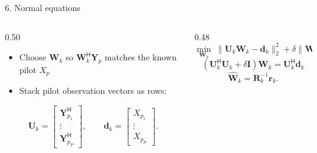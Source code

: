 \documentclass[aspectratio=169,10pt]{beamer}
\newcommand{\vY}{\bm{Y}}
\newcommand{\vW}{\bm{W}}
\newcommand{\herm}{\mathsf{H}}
\begin{document}
\begin{frame}{6. Normal equations}

  \begin{columns}[T,onlytextwidth]
    \begin{column}{0.50\textwidth}
      \begin{itemize}\setlength{\itemsep}{0.35em}
        \item Choose $\vW_k$ so $\vW_k^{\herm}\vY_p$ matches the known pilot $X_p$
        \item Stack pilot observation vectors as rows:
      \end{itemize}
      \vspace{-0.5em}
      \[
        \bm U_k=
        \begin{bmatrix}
          \vY_{p_1}^{\herm}\\[-1pt]
          \vdots\\[-1pt]
          \vY_{p_P}^{\herm}
        \end{bmatrix},
        \qquad
        \bm d_k=
        \begin{bmatrix}
          X_{p_1}\\[-1pt]
          \vdots\\[-1pt]
          X_{p_P}
        \end{bmatrix}.
      \]
    \end{column}

    \begin{column}{0.48\textwidth}
      \vspace{-0.3em}
      \[
        \min_{\vW_k}\;
        \|\bm U_k\vW_k-\bm d_k\|_2^2
        +\delta\|\vW_k\|_2^2
      \]
      \vspace{-0.5em}
      \[
        (\bm U_k^{\herm}\bm U_k+\delta\bm I)\vW_k
        =
        \bm U_k^{\herm}\bm d_k
      \]
      \vspace{-0.5em}
      \[
        \widehat{\vW}_k=\bm R_k^{-1}\bm r_k.
      \]
    \end{column}
  \end{columns}

  \vfill
  \begin{center}
  \end{center}

\end{frame}
\end{document}

